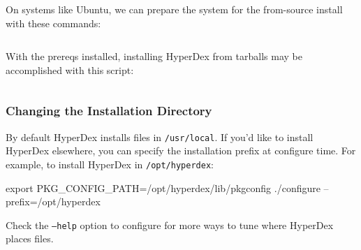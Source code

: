On systems like Ubuntu, we can prepare the system for the from-source install
with these commands:

\inputminted[frame=lines,framesep=2mm,firstline=3]{bash}{\topdir/install/ubuntu14.04-source-prereqs.sh}

With the prereqs installed, installing HyperDex from tarballs may be
accomplished with this script:

\inputminted[frame=lines,framesep=2mm,firstline=5]{bash}{\topdir/install/source-install.sh}

\subsubsection{Changing the Installation Directory}
\label{sec:installation:source:prefix}

By default HyperDex installs files in \texttt{/usr/local}.  If you'd like to
install HyperDex elsewhere, you can specify the installation prefix at configure
time.  For example, to install HyperDex in \texttt{/opt/hyperdex}:

\begin{consolecode}
export PKG_CONFIG_PATH=/opt/hyperdex/lib/pkgconfig
./configure --prefix=/opt/hyperdex
\end{consolecode}

Check the \texttt{--help} option to configure for more ways to tune where
HyperDex places files.


